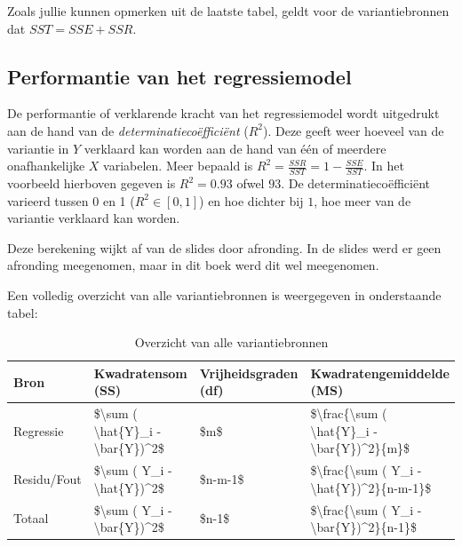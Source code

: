 \documentclass[
]{book}
\theoremstyle{definition}
\theoremstyle{definition}
\theoremstyle{definition}
\theoremstyle{definition}
\theoremstyle{remark}
\begin{document}
Zoals jullie kunnen opmerken uit de laatste tabel, geldt voor de variantiebronnen dat \(SST = SSE + SSR\).

\newpage

\hypertarget{performantie-van-het-regressiemodel}{%
\subsection*{Performantie van het regressiemodel}\label{performantie-van-het-regressiemodel}}


De performantie of verklarende kracht van het regressiemodel wordt uitgedrukt aan de hand van de \emph{determinatiecoëfficiënt} (\(R^2\)). Deze geeft weer hoeveel van de variantie in \(Y\) verklaard kan worden aan de hand van één of meerdere onafhankelijke \(X\) variabelen. Meer bepaald is \(R^2 = \frac{SSR}{SST} = 1 - \frac{SSE}{SST}\). In het voorbeeld hierboven gegeven is \(R^2 = 0.93\) ofwel \(93%
\). De determinatiecoëfficiënt varieerd tussen 0 en 1 (\(R^2 \in [0,1]\)) en hoe dichter bij \(1\), hoe meer van de variantie verklaard kan worden.

Deze berekening wijkt af van de slides door afronding. In de slides werd er geen afronding meegenomen, maar in dit boek werd dit wel meegenomen.

Een volledig overzicht van alle variantiebronnen is weergegeven in onderstaande tabel:

\begin{table}

\caption{\label{tab:unnamed-chunk-13}Overzicht van alle variantiebronnen}
\centering
\begin{tabular}[t]{llll}
\toprule
Bron & Kwadratensom (SS) & Vrijheidsgraden (df) & Kwadratengemiddelde (MS)\\
\midrule
Regressie & \$\textbackslash{}sum ( \textbackslash{}hat\{Y\}\_i - \textbackslash{}bar\{Y\})\textasciicircum{}2\$ & \$m\$ & \$\textbackslash{}frac\{\textbackslash{}sum ( \textbackslash{}hat\{Y\}\_i - \textbackslash{}bar\{Y\})\textasciicircum{}2\}\{m\}\$\\
Residu/Fout & \$\textbackslash{}sum ( Y\_i - \textbackslash{}hat\{Y\})\textasciicircum{}2\$ & \$n-m-1\$ & \$\textbackslash{}frac\{\textbackslash{}sum ( Y\_i - \textbackslash{}hat\{Y\})\textasciicircum{}2\}\{n-m-1\}\$\\
Totaal & \$\textbackslash{}sum ( Y\_i - \textbackslash{}bar\{Y\})\textasciicircum{}2\$ & \$n-1\$ & \$\textbackslash{}frac\{\textbackslash{}sum ( Y\_i - \textbackslash{}bar\{Y\})\textasciicircum{}2\}\{n-1\}\$\\
\bottomrule
\end{tabular}
\end{table}
\end{document}
